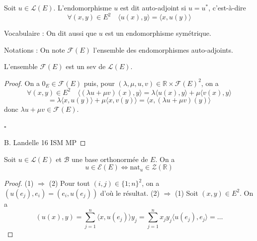 \begin{definition}
\label{def:14}

Soit $u \in \mathcal{L}(E)$. L'endomorphisme $u$ est dit auto-adjoint si $u = u^*$, c'est-à-dire
\[
\forall (x, y) \in E^2 \quad \langle u(x), y \rangle = \langle x, u(y) \rangle
\]

Vocabulaire : On dit aussi que $u$ est un endomorphisme symétrique.

Notations : On note $\mathcal{F}(E)$ l'ensemble des endomorphismes auto-adjoints.

\end{definition}

\begin{proposition}
\label{prop:24}

L'ensemble $\mathcal{F}(E)$ est un sev de $\mathcal{L}(E)$.

\end{proposition}

\begin{proof}

On a $0_{E} \in \mathcal{F}(E)$ puis, pour $(\lambda, \mu, u, v) \in \mathbb{R} \times \mathcal{F}(E)^2$, on a
\[
\forall (x, y) \in E^2 \quad \langle (\lambda u + \mu v)(x), y \rangle = \lambda \langle u(x), y \rangle + \mu \langle v(x), y \rangle
\]
\[
= \lambda \langle x, u(y) \rangle + \mu \langle x, v(y) \rangle = \langle x, (\lambda u + \mu v)(y) \rangle
\]
donc $\lambda u + \mu v \in \mathcal{F}(E)$.

\hfill $\square$

B. Landelle \hspace{2cm} 16 \hspace{2cm} ISM MP

\end{proof}

\begin{proposition}
\label{prop:25}

Soit $u \in \mathcal{L}(E)$ et $\mathcal{B}$ une base orthonormée de $E$. On a
\[ u \in \mathcal{E}(E) \iff \text{nat}_{u} \in \mathcal{Z}(\mathbb{R}) \]
\end{proposition}

\begin{proof}

(1) $\Rightarrow$ (2) Pour tout $(i,j) \in \{1; n\}^2$, on a $(u(e_j), e_i) = (e_i, u(e_j))$ d'où le résultat.
(2) $\Rightarrow$ (1) Soit $(x,y) \in E^2$. On a
\[ (u(x), y) = \sum_{j=1}^n \langle x, u(e_j) \rangle y_j = \sum_{j=1}^n x_j y_j \langle u(e_j), e_j \rangle = \dots \]
\end{proof}

